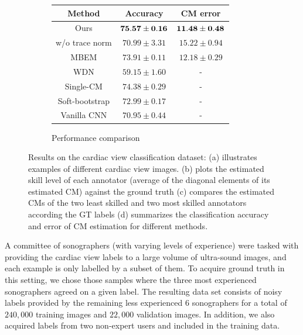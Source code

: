 \begin{figure}[h]
	\begin{subfigure}[]{0.55\linewidth}
		\vspace{3mm}
		\caption{Performance comparison}
		\begin{tabular}{|c|c c|} 
			\hline
			Method & Accuracy & CM error \\ 
			\hline
			Ours & $\bf{75.57\pm 0.16}$ &  $\bf{11.48 \pm 0.48}$ \\ 
			w/o trace norm & $70.99 \pm 3.31$ & $15.22 \pm0.94$  \\ 
			MBEM \cite{khetan2017learning} & $73.91\pm 0.11$ & $12.18\pm0.29$ \\ 
			WDN \cite{guan2017said} & $59.15 \pm 1.60$ & - \\ 
			Single-CM \cite{sukhbaatar2014training} & $74.38\pm0.29$ & - \\ 
			Soft-bootstrap \cite{reed2014training} & $72.99\pm 0.17$ & - \\ 
			Vanilla CNN & $70.95\pm 0.44$ & -\\ 
			\hline
		\end{tabular}
		
	\end{subfigure}
	\caption{\small Results on the cardiac view classification dataset: (a) illustrates examples of different cardiac view images. (b) plots the estimated skill level of each annotator (average of the diagonal elements of its estimated CM)  against the ground truth (c) compares the estimated CMs of the two least skilled and two most skilled annotators according the GT labels (d) summarizes the classification accuracy and error of CM estimation for different methods. }
	\label{fig:us_experiments}
\end{figure}


A committee of sonographers (with varying levels of experience) were tasked with providing the cardiac view labels to a large volume of ultra-sound images, and each example is only labelled by a subset of them. To acquire ground truth in this setting, we chose those samples where the three most experienced sonographers agreed on a given label. The resulting data set consists of noisy labels provided by the remaining less experienced $6$ sonographers for a total of $240,000$ training images and $22,000$ validation images. In addition, we also acquired labels from two non-expert users and included in the training data. 

